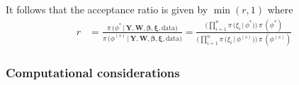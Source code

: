 \documentclass[11pt]{article}
\renewcommand{\vec}{\boldsymbol}
\newcommand{\barS}{\,|\,}
\begin{document}
\begin{enumerate}[label=Step \arabic*., leftmargin=13mm, itemsep=10mm]
It follows that the acceptance ratio is given by $\min(r,1)$ where
\begin{align*}
r &= \frac{ \pi\, \big( \phi^* \barS \vec{Y}, \vec{W}, \vec{\beta}, \vec{\xi}, \text{data} \big) }{ \pi\, \big( \phi^{(s)} \barS \vec{Y}, \vec{W}, \vec{\beta}, \vec{\xi}, \text{data} \big) } = \frac{ \bigg( \prod_{i=1}^n \pi\,\big( \xi_i \barS \phi^* \big) \bigg)\, \pi\,(\phi^*) }{ \bigg( \prod_{i=1}^n \pi\,\big( \xi_i \barS \phi^{(s)} \big) \bigg)\, \pi\,(\phi^{(s)}) }
\end{align*}

\end{enumerate}





\subsubsection{Computational considerations}
\end{document}
